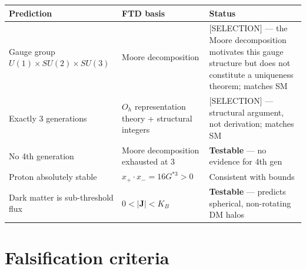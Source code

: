 \documentclass[
  11pt,
  letterpaper,
  twoside,
  openany]{book}
\makeatletter
\let\orig@section\section
\renewcommand{\section}{\needspace{8\baselineskip}\orig@section}
\newcommand{\Gscu}{G^{*3}{}}      %
\makeatother
\begin{document}
\begin{longtable}[]{@{}
  >{\raggedright\arraybackslash}p{}
  >{\raggedright\arraybackslash}p{}
  >{\raggedright\arraybackslash}p{}@{}}
\toprule\noalign{}
\begin{minipage}[b]{\linewidth}\raggedright
Prediction
\end{minipage} & \begin{minipage}[b]{\linewidth}\raggedright
FTD basis
\end{minipage} & \begin{minipage}[b]{\linewidth}\raggedright
Status
\end{minipage} \\
\midrule\noalign{}
\endhead
\bottomrule\noalign{}
\endlastfoot
Gauge group \(U(1) \times SU(2) \times SU(3)\) & Moore decomposition &
{[}SELECTION{]} --- the Moore decomposition motivates this gauge
structure but does not constitute a uniqueness theorem; matches SM \\
Exactly 3 generations & \(O_h\) representation theory + structural
integers & {[}SELECTION{]} --- structural argument, not derivation;
matches SM \\
No 4th generation & Moore decomposition exhausted at 3 &
\textbf{Testable} --- no evidence for 4th gen \\
Proton absolutely stable & \(x_+ \cdot x_- = 16\Gscu > 0\) & Consistent
with bounds \\
Dark matter is sub-threshold flux & \(0 < |\mathbf{J}| < K_B\) &
\textbf{Testable} --- predicts spherical, non-rotating DM halos \\
\end{longtable}

\section{Falsification criteria}\label{falsification-criteria}
\end{document}
